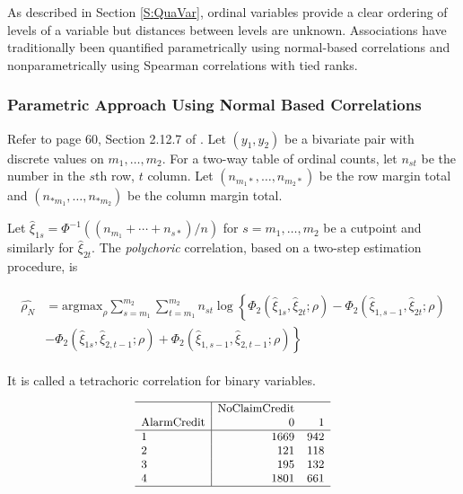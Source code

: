 \documentclass[]{book}
\theoremstyle{definition}
\theoremstyle{definition}
\theoremstyle{definition}
\theoremstyle{remark}
\begin{document}
As described in Section \ref{S:QuaVar}, ordinal variables provide a
clear ordering of levels of a variable but distances between levels are
unknown. Associations have traditionally been quantified parametrically
using normal-based correlations and nonparametrically using Spearman
correlations with tied ranks.

\subsubsection{Parametric Approach Using Normal Based
Correlations}\label{parametric-approach-using-normal-based-correlations}

Refer to page 60, Section 2.12.7 of \citep{joe2014dependence}. Let
\((y_1,y_2)\) be a bivariate pair with discrete values on
\(m_1, \ldots, m_2\). For a two-way table of ordinal counts, let
\(n_{st}\) be the number in the \(s\)th row, \(t\) column. Let
\((n_{m_1*}, \ldots, n_{m_2*})\) be the row margin total and
\((n_{*m_1}, \ldots, n_{*m_2})\) be the column margin total.

Let \(\hat{\xi}_{1s} = \Phi^{-1}((n_{m_1}+\cdots+n_{s*})/n)\) for
\(s=m_1, \ldots, m_2\) be a cutpoint and similarly for
\(\hat{\xi}_{2t}\). The \emph{polychoric} correlation, based on a
two-step estimation procedure, is

\begin{eqnarray*}
\begin{array}{cr}
  \hat{\rho_N} &=\text{argmax}_{\rho}
  \sum_{s=m_1}^{m_2} \sum_{t=m_1}^{m_2} n_{st} \log\left\{
    \Phi_2(\hat{\xi}_{1s}, \hat{\xi}_{2t};\rho)
    -\Phi_2(\hat{\xi}_{1,s-1}, \hat{\xi}_{2t};\rho) \right.\\
   & \left. -\Phi_2(\hat{\xi}_{1s}, \hat{\xi}_{2,t-1};\rho)
    +\Phi_2(\hat{\xi}_{1,s-1}, \hat{\xi}_{2,t-1};\rho)
    \right\}
\end{array}
\end{eqnarray*}

It is called a tetrachoric correlation for binary variables.

\[
{\small \begin{matrix}
\begin{array}{l|rr} 
    \hline
                  & \text{NoClaimCredit} &  \\
\text{AlarmCredit} & 0     & 1      \\
  \hline
          1  & 1669  &  942   \\
          2  &    121 &  118 \\
          3  &  195  &   132 \\
          4 &  1801  &   661 \\
   \hline
\end{array}
\end{matrix}}
\]
\end{document}
